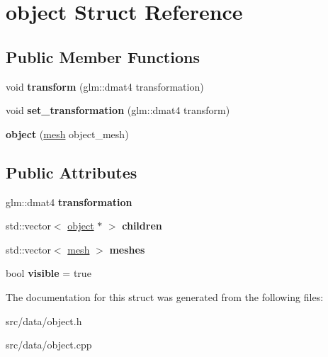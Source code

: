 \hypertarget{structobject}{}\section{object Struct Reference}
\label{structobject}
\subsection*{Public Member Functions}
\begin{DoxyCompactItemize}
\item 
\hypertarget{structobject_a55a53086a9b2e1961238b51d13802301}{}void {\bfseries transform} (glm\+::dmat4 transformation)\label{structobject_a55a53086a9b2e1961238b51d13802301}

\item 
\hypertarget{structobject_a311f3cdf9dc591d34f98f92c46c88b53}{}void {\bfseries set\+\_\+transformation} (glm\+::dmat4 transform)\label{structobject_a311f3cdf9dc591d34f98f92c46c88b53}

\item 
\hypertarget{structobject_a0d7fd0c258788ef88eb0ab235b845118}{}{\bfseries object} (\hyperlink{structmesh}{mesh} object\+\_\+mesh)\label{structobject_a0d7fd0c258788ef88eb0ab235b845118}

\end{DoxyCompactItemize}
\subsection*{Public Attributes}
\begin{DoxyCompactItemize}
\item 
\hypertarget{structobject_a6a77575fc87972f3f6d8384ae1401f86}{}glm\+::dmat4 {\bfseries transformation}\label{structobject_a6a77575fc87972f3f6d8384ae1401f86}

\item 
\hypertarget{structobject_a38d70b54bfa30c1da1e9bc53d89c3e7a}{}std\+::vector$<$ \hyperlink{structobject}{object} $\ast$ $>$ {\bfseries children}\label{structobject_a38d70b54bfa30c1da1e9bc53d89c3e7a}

\item 
\hypertarget{structobject_a9b66e4d0a95e78f0e375ae0ee0c01ef8}{}std\+::vector$<$ \hyperlink{structmesh}{mesh} $>$ {\bfseries meshes}\label{structobject_a9b66e4d0a95e78f0e375ae0ee0c01ef8}

\item 
\hypertarget{structobject_ab4a96bab81be797037c90f098a2dd8e4}{}bool {\bfseries visible} = true\label{structobject_ab4a96bab81be797037c90f098a2dd8e4}

\end{DoxyCompactItemize}


The documentation for this struct was generated from the following files\+:\begin{DoxyCompactItemize}
\item 
src/data/object.\+h\item 
src/data/object.\+cpp\end{DoxyCompactItemize}

